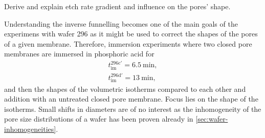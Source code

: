 \documentclass[../thesis.tex]{subfiles}
\begin{document}
              Derive and explain etch rate gradient and influence on the pores' shape.
              \medskip

              Understanding the inverse funnelling becomes one of the main goals of the experimens with wafer 296 as it might be used to correct the shapes of the pores of a given membrane. Therefore, immersion experiments where two closed pore membranes are immersed in phosphoric acid for
              \begin{equation}
                \begin{split}
                  t^\mathrm{296c'}_\mathrm{im}=\SI{6,5}{\minute},    \\
                  t^\mathrm{296d'}_\mathrm{im}=\SI{13}{\minute},
                \end{split}
                \label{eq:immersion-times}
              \end{equation}
              and then the shapes of the volumetric isotherms compared to each other and addition with an untreated closed pore membrane. Focus lies on the shape of the isotherms. Small shifts in diameters are of no interest as the inhomogeneity of the pore size distributions of a wafer has been proven already in \cref{sec:wafer-inhomogeneities}.

              
\end{document}

